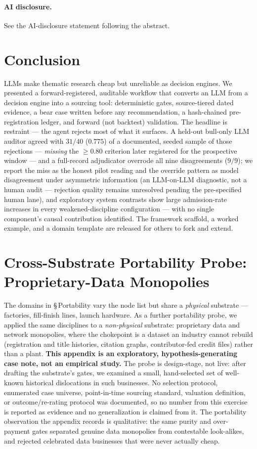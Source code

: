 \documentclass[11pt]{article}
\begin{document}
\paragraph{AI disclosure.} See the AI-disclosure statement following the abstract.

\section{Conclusion}
LLMs make thematic research cheap but unreliable as decision engines. We presented a
forward-registered, auditable workflow that converts an LLM from a decision engine into a sourcing
tool: deterministic gates, source-tiered dated evidence, a bear case written before any
recommendation, a hash-chained pre-registration ledger, and forward (not backtest) validation. The
headline is restraint --- the agent rejects most of what it surfaces. A held-out bull-only LLM
auditor agreed with $31/40$ ($0.775$) of a documented, seeded sample of those rejections ---
\emph{missing} the $\geq 0.80$ criterion later registered for the prospective window --- and a
full-record adjudicator overrode all nine
disagreements ($9/9$); we report the miss as the honest pilot reading and the override pattern as
model disagreement under asymmetric information (an LLM-on-LLM diagnostic, not a human audit ---
rejection quality remains unresolved pending the pre-specified human lane), and exploratory
system contrasts show large admission-rate increases in every weakened-discipline configuration
--- with no single component's causal contribution identified.
The framework scaffold, a worked example, and a domain template are released for others to fork
and extend.

\appendix
\section{Cross-Substrate Portability Probe: Proprietary-Data Monopolies}
\label{app:substrate}

The domains in \S\,Portability vary the node list but share a \emph{physical} substrate ---
factories, fill-finish lines, launch hardware. As a further portability probe, we applied the same
disciplines to a \emph{non-physical} substrate: proprietary data and network monopolies, where the
chokepoint is a dataset an industry cannot rebuild (registration and title histories, citation
graphs, contributor-fed credit files) rather than a plant. \textbf{This appendix is an exploratory,
hypothesis-generating case note, not an empirical study.} The probe is design-stage, not live: after
drafting the substrate's gates, we examined a small, hand-selected set of well-known historical
dislocations in such businesses. No selection protocol, enumerated case universe, point-in-time
sourcing standard, valuation definition, or outcome/re-rating protocol was documented, so no number
from this exercise is reported as evidence and no generalization is claimed from it. The portability
observation the appendix records is qualitative: the same purity
and over-payment gates separated genuine data monopolies from contestable look-alikes, and rejected
celebrated data businesses that were never actually cheap.
\end{document}
